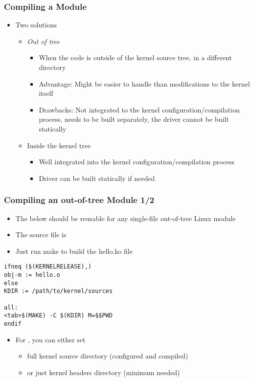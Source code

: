 \begin{frame}
  \frametitle{Compiling a Module}
  \begin{itemize}
  \item Two solutions
    \begin{itemize}
    \item \emph{Out of tree}
      \begin{itemize}
      \item When the code is outside of the kernel source tree, in a
        different directory
      \item Advantage: Might be easier to handle than modifications to
        the kernel itself
      \item Drawbacks: Not integrated to the kernel
        configuration/compilation process, needs to be built
        separately, the driver cannot be built statically
      \end{itemize}
    \item Inside the kernel tree
      \begin{itemize}
      \item Well integrated into the kernel configuration/compilation
        process
      \item Driver can be built statically if needed
      \end{itemize}
    \end{itemize}
  \end{itemize}
\end{frame}

\begin{frame}[fragile]
  \frametitle{Compiling an out-of-tree Module 1/2}
  \begin{itemize}
  \item The below  should be reusable for any single-file
    out-of-tree Linux module
  \item The source file is 
  \item Just run make to build the hello.ko file
  \end{itemize}
\begin{block}{}
\begin{verbatim}
ifneq ($(KERNELRELEASE),)
obj-m := hello.o
else
KDIR := /path/to/kernel/sources

all:
<tab>$(MAKE) -C $(KDIR) M=$$PWD
endif
\end{verbatim}
\end{block}

\begin{itemize}
\item For , you can either set
  \begin{itemize}
  \item full kernel source directory (configured and compiled)
  \item or just kernel headers directory (minimum needed)
  \end{itemize}
\end{itemize}
\end{frame}


